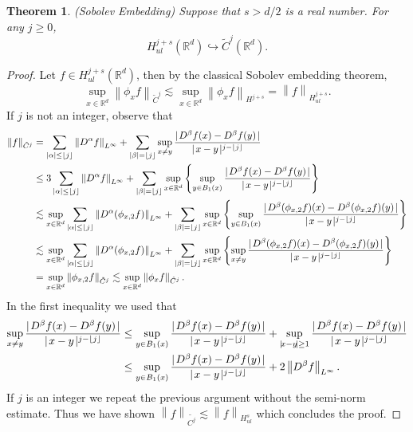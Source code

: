 \documentclass[12pt,xcolor=svgnames]{amsart}
\newtheorem{theorem}{Theorem}[section]
\newcommand{\R}{\mathbb{R}}
\newcommand{\abs}[1]{\mid\!#1\!\mid}
\newcommand{\norm}[2]{\left\lVert#1\right\rVert_{#2}}
\DeclarePairedDelimiter\floor{\lfloor}{\rfloor}
\begin{document}
\begin{theorem}
\label{sobolev embedding}(Sobolev Embedding) Suppose that $s>d/2$ is a real number. For any $j \geq 0$, 
$$H_{ul}^{j+s}(\R^d) \hookrightarrow \tilde{C}^j(\R^d).$$ 
\end{theorem}
\begin{proof}
Let $f \in H_{ul}^{j+s}(\R^d)$, then by the classical Sobolev embedding theorem, 
$$
\sup_{x \in \mathbb{R}^d}\norm{\phi_xf}{\tilde{C}^j} \lesssim \sup_{x \in \R^d}\norm{\phi_xf}{H^{j+s}} = \norm{f}{H^{j+s}_{ul}}.
$$
If $j$ is not an integer, observe that 
\begin{align*}
\norm{f}{\tilde{C}^j}&=\sum_{|\alpha|\leq\floor{j}}\norm{D^{\alpha}f}{L^{\infty}}+\sum_{|\beta|=\floor{j}}\sup_{x \neq y} \frac{\abs{D^{\beta}f(x)-D^{\beta}f(y)}}{\abs{x-y}^{j-\floor{j}}}\\
&\leq 
3\sum_{|\alpha|\leq\floor{j}}\norm{D^{\alpha}f}{L^{\infty}}+\sum_{|\beta|=\floor{j}}\sup_{x \in \R^d}\left\{\sup_{y \in B_1(x)} \frac{\abs{D^{\beta}f(x)-D^{\beta}f(y)}}{\abs{x-y}^{j-\floor{j}}}\right\}\\
&\lesssim 
 \sup_{x \in \R^d}\sum_{|\alpha|\leq\floor{j}}\norm{D^{\alpha}(\phi_{x,2}f)}{L^{\infty}}+\sum_{|\beta|=\floor{j}}\sup_{x\in\R^d}\left\{\sup_{y \in B_1(x)} \frac{\abs{D^{\beta}(\phi_{x,2}f)(x)-D^{\beta}(\phi_{x,2}f)(y)}}{\abs{x-y}^{j-\floor{j}}}\right\}\\
&\lesssim  \sup_{x \in \R^d}\sum_{|\alpha|\leq\floor{j}}\norm{D^{\alpha}(\phi_{x,2}f)}{L^{\infty}}+\sum_{|\beta|=\floor{j}}\sup_{x\in\R^d}\left\{\sup_{x\neq y} \frac{\abs{D^{\beta}(\phi_{x,2}f)(x)-D^{\beta}(\phi_{x,2}f)(y)}}{\abs{x-y}^{j-\floor{j}}}\right\}\\
&=\sup_{x \in \R^d}\norm{\phi_{x,2}f}{\tilde{C}^j}\lesssim \sup_{x \in \R^d} \norm{\phi_xf}{\tilde{C}^j}.
\end{align*}
In the first inequality we used that 
\begin{align*}
\sup_{x \neq y} \frac{\abs{D^{\beta}f(x)-D^{\beta}f(y)}}{\abs{x-y}^{j-\floor{j}}} &\leq 
\sup_{y \in B_1(x)} \frac{\abs{D^{\beta}f(x)-D^{\beta}f(y)}}{\abs{x-y}^{j-\floor{j}}} + \sup_{\abs{x-y} \geq 1} \frac{\abs{D^{\beta}f(x)-D^{\beta}f(y)}}{\abs{x-y}^{j-\floor{j}}}\\ & \leq \sup_{y \in B_1(x)} \frac{\abs{D^{\beta}f(x)-D^{\beta}f(y)}}{\abs{x-y}^{j-\floor{j}}} + 2\norm{D^{\beta}f}{L^{\infty}}. 
\end{align*}
If $j$ is an integer we repeat the previous argument without the semi-norm estimate.
Thus we have shown $\norm{f}{\tilde{C^j}} \lesssim  \norm{f}{H_{ul}^s}$ which concludes the proof.
\end{proof}
\end{document}
